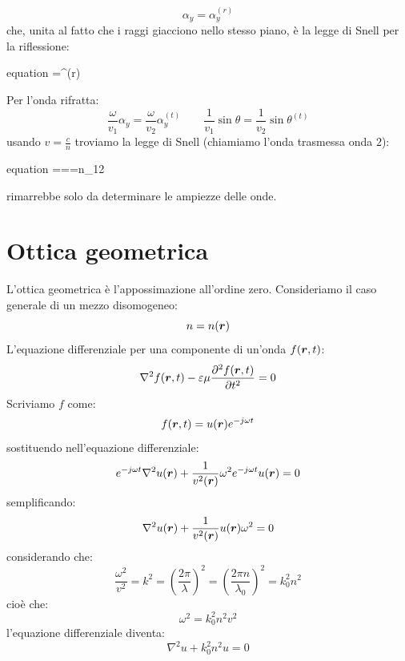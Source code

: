 \[
  \alpha_y = \alpha_y^{(r)}
\]
che, unita al fatto che i raggi giacciono nello stesso piano, è la legge di Snell per la riflessione:
\begin{eqimp}{equation}
  \theta=\theta^{(r)}
\end{eqimp}
Per l'onda rifratta:
\[
  \frac{\omega}{v_1}\alpha_y=\frac{\omega}{v_2}\alpha_y^{(t)}
  \qquad
  \frac{1}{v_1}\sin\theta=\frac{1}{v_2}\sin\theta^{(t)}
\]
usando $v=\frac{c}{n}$ troviamo la legge di Snell (chiamiamo l'onda trasmessa onda $2$):
\begin{eqimp}{equation}
  ===n_{12}
\end{eqimp}
rimarrebbe solo da determinare le ampiezze delle onde.


\section{Ottica geometrica}
L'ottica geometrica è l'appossimazione all'ordine zero. Consideriamo il caso generale di un mezzo disomogeneo:
\begin{equation}
  n=n(\boldsymbol{r})
\end{equation}
L'equazione differenziale per una componente di un'onda $f(\boldsymbol{r},t)$:
\begin{equation}
  \nabla^2 f(\boldsymbol{r},t)-\varepsilon\mu\frac{\partial^2 f(\boldsymbol{r},t)}{\partial t^2}=0
\end{equation}
Scriviamo $f$ come:
\begin{equation}
  f(\boldsymbol{r},t)=u(\boldsymbol{r})e^{-j\omega t}
\end{equation}
sostituendo nell'equazione differenziale:
\begin{equation}
  e^{-j\omega t}\nabla^2 u(\boldsymbol{r})+\frac{1}{v^2(\boldsymbol{r})}\omega^2e^{-j\omega t}u(\boldsymbol{r})=0
\end{equation}
semplificando:
\begin{equation}
  \nabla^2 u(\boldsymbol{r})+\frac{1}{v^2(\boldsymbol{r})}u(\boldsymbol{r})\omega^2=0
\end{equation}
considerando che:
\begin{equation}
  \frac{\omega^2}{v^2}=k^2=\left(\frac{2\pi}{\lambda}\right)^2=\left(\frac{2\pi n}{\lambda_0}\right)^2=k_0^2n^2
\end{equation}
cioè che:
\begin{equation}
  \omega^2=k_0^2n^2v^2
\end{equation}
l'equazione differenziale diventa:
\begin{equation}
  \nabla^2 u+k_0^2n^2 u=0
  \label{238}
\end{equation}
